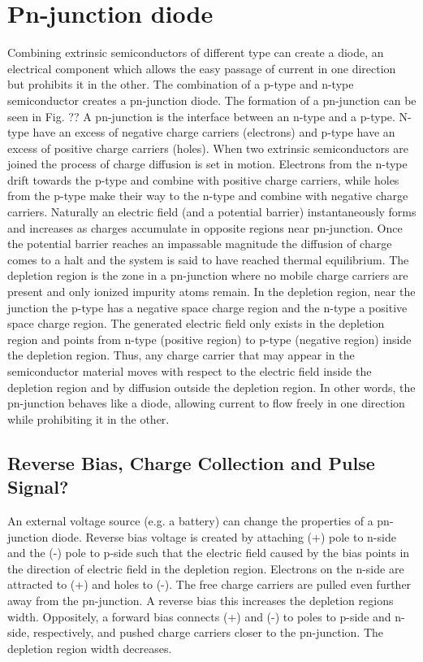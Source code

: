 \section{Pn-junction diode}
Combining extrinsic semiconductors of different type can create a diode, an electrical component which allows the easy passage of current in one direction but prohibits it in the other. The combination of a p-type and n-type semiconductor creates a pn-junction diode. The formation of a pn-junction can be seen in Fig. ??
A pn-junction is the interface between an n-type and a p-type. N-type have an excess of negative charge carriers (electrons) and p-type have an excess of positive charge carriers (holes). When two extrinsic semiconductors are joined the process of charge diffusion is set in motion. Electrons from the n-type drift towards the p-type and combine with positive charge carriers, while holes from the p-type make their way to the n-type and combine with negative charge carriers. Naturally an electric field (and a potential barrier) instantaneously forms and increases as charges accumulate in opposite regions near pn-junction. Once the potential barrier reaches an impassable magnitude the diffusion of charge comes to a halt and the system is said to have reached thermal equilibrium. The depletion region is the zone in a pn-junction where no mobile charge carriers are present and only ionized impurity atoms remain. In the depletion region, near the junction the p-type has a negative space charge region and the n-type a positive space charge region. The generated electric field only exists in the depletion region and points from n-type (positive region) to p-type (negative region) inside the depletion region. Thus, any charge carrier that may appear in the semiconductor material moves with respect to the electric field inside the depletion region and by diffusion outside the depletion region. In other words, the pn-junction behaves like a diode, allowing current to flow freely in one direction while prohibiting it in the other.

\subsection{Reverse Bias, Charge Collection and Pulse Signal?} %
An external voltage source (e.g. a battery) can change the properties of a pn-junction diode. Reverse bias voltage is created by attaching (+) pole to n-side and the (-) pole to p-side such that the electric field caused by the bias points in the direction of electric field in the depletion region.  Electrons on the n-side are attracted to (+) and holes to (-). The free charge carriers are pulled even further away from the pn-junction. A reverse bias this increases the depletion regions width.
Oppositely, a forward bias connects (+) and (-) to poles to p-side and n-side, respectively, and pushed charge carriers closer to the pn-junction. The depletion region width decreases.

